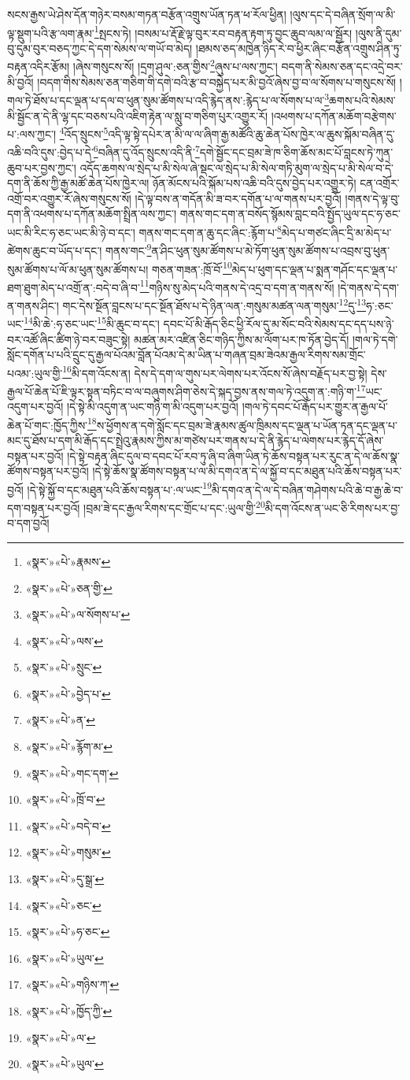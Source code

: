 སངས་རྒྱས་ཡེ་ཤེས་དོན་གཉེར་བསམ་གཏན་བརྩོན་འགྲུས་ཡོན་ཏན་ཕ་རོལ་ཕྱིན། །ལུས་དང་དེ་བཞིན་སྲོག་ལ་མི་ལྟ་སྡུག་པའི་རྩ་ལག་རྣམ་\footnote{«སྣར་»«པེ་»རྣམས་}སྤངས་ཏེ། །བསམ་པ་རྡོ་རྗེ་ལྟ་བུར་རབ་བརྟན་རྟག་ཏུ་བྱང་ཆུབ་ལམ་ལ་སྦྱོར། །ལུས་ནི་དུམ་བུ་དུམ་བུར་བཅད་ཀྱང་དེ་དག་སེམས་ལ་གཡོ་བ་མེད། །ཐམས་ཅད་མཁྱེན་ཉིད་རེ་བ་ཕྱིར་ཞིང་བརྩོན་འགྲུས་ཤིན་ཏུ་བརྟན་འདིར་རྩོམ། །ཞེས་གསུངས་སོ། །དྲག་ཤུལ་:ཅན་གྱིས་\footnote{«སྣར་»«པེ་»ཅན་གྱི་}ཞུས་པ་ལས་ཀྱང་། བདག་ནི་སེམས་ཅན་དང་འདྲེ་བར་མི་བྱའོ། །བདག་གིས་སེམས་ཅན་གཅིག་གི་དགེ་བའི་རྩ་བ་བསྐྱེད་པར་མི་བྱའོ་ཞེས་བྱ་བ་ལ་སོགས་པ་གསུངས་སོ། །གལ་ཏེ་ཐོས་པ་དང་ལྡན་པ་དལ་བ་ཕུན་སུམ་ཚོགས་པ་འདི་རྙེད་ནས་:རྙེད་པ་ལ་སོགས་པ་ལ་\footnote{«སྣར་»«པེ་»ལ་སོགས་པ་}ཆགས་པའི་སེམས་མི་སྦྱོང་ན་དེ་ནི་ལྷ་དང་བཅས་པའི་འཇིག་རྟེན་ལ་སླུ་བ་གཅིག་པུར་འགྱུར་རོ། །འཕགས་པ་དཀོན་མཆོག་བརྩེགས་པ་:ལས་ཀྱང་། \footnote{«སྣར་»«པེ་»ལས་}འོད་སྲུངས་\footnote{«སྣར་»«པེ་»སྲུང་}འདི་ལྟ་སྟེ་དཔེར་ན་མི་ལ་ལ་ཞིག་རྒྱ་མཚོའི་ཆུ་ཆེན་པོས་ཁྱེར་ལ་ཆུས་སྐོམ་བཞིན་དུ་འཆི་བའི་དུས་:བྱེད་པ་དེ་\footnote{«སྣར་»«པེ་»བྱེད་པ་}བཞིན་དུ་འོད་སྲུངས་འདི་ནི་\footnote{«སྣར་»«པེ་»ན་}དགེ་སྦྱོང་དང་བྲམ་ཟེ་ཁ་ཅིག་ཆོས་མང་པོ་བླངས་ཏེ་ཀུན་ཆུབ་པར་བྱས་ཀྱང་། འདོད་ཆགས་ལ་སྲེད་པ་མི་སེལ་ཞེ་སྡང་ལ་སྲེད་པ་མི་སེལ་གཏི་མུག་ལ་སྲེད་པ་མི་སེལ་བ་དེ་དག་ནི་ཆོས་ཀྱི་རྒྱ་མཚོ་ཆེན་པོས་ཁྱེར་ལ། ཉོན་མོངས་པའི་སྐོམ་པས་འཆི་བའི་དུས་བྱེད་པར་འགྱུར་ཏེ། ངན་འགྲོར་འགྲོ་བར་འགྱུར་རོ་ཞེས་གསུངས་སོ། །དེ་ལྟ་བས་ན་གདོན་མི་ཟ་བར་དགོན་པ་ལ་གནས་པར་བྱའོ། །གནས་དེ་ལྟ་བུ་དག་ནི་འཕགས་པ་དཀོན་མཆོག་སྤྲིན་ལས་ཀྱང་། གནས་གང་དག་ན་བསོད་སྙོམས་བླང་བའི་སྤྱོད་ཡུལ་དང་ཧ་ཅང་ཡང་མི་རིང་ཧ་ཅང་ཡང་མི་ཉེ་བ་དང་། གནས་གང་དག་ན་ཆུ་དང་ཞིང་:རྙོག་པ་\footnote{«སྣར་»«པེ་»རྙོག་མ་}མེད་པ་གཙང་ཞིང་དྲི་མ་མེད་པ་ཚེགས་ཆུང་བ་ཡོད་པ་དང་། གནས་གང་\footnote{«སྣར་»«པེ་»གང་དག་}ན་ཤིང་ཕུན་སུམ་ཚོགས་པ་མེ་ཏོག་ཕུན་སུམ་ཚོགས་པ་འབྲས་བུ་ཕུན་སུམ་ཚོགས་པ་ལོ་མ་ཕུན་སུམ་ཚོགས་པ། གཅན་གཟན་:ཁྲོ་བོ་\footnote{«སྣར་»«པེ་»ཁྲོ་བ་}མེད་པ་ཕུག་དང་ལྡན་པ་སྨན་གཤོང་དང་ལྡན་པ་ཐག་ཐུག་མེད་པ་འགྲོ་ན་:བདེ་བ་ཞི་བ་\footnote{«སྣར་»«པེ་»བདེ་བ་}གཉིས་སུ་མེད་པའི་གནས་དེ་འདྲ་བ་དག་ན་གནས་སོ། །དེ་གནས་དེ་དག་ན་གནས་ཤིང་། གང་དེས་སྔོན་བླངས་པ་དང་སྔོན་ཐོས་པ་དེ་ཉིན་ལན་:གསུམ་མཚན་ལན་གསུམ་\footnote{«སྣར་»«པེ་»གསུམ་}དུ་\footnote{«སྣར་»«པེ་»དུ་སྒྲ་}ཧ་:ཅང་ཡང་\footnote{«སྣར་»«པེ་»ཅང་}མི་ཆེ་:ཧ་ཅང་ཡང་\footnote{«སྣར་»«པེ་»ཧ་ཅང་}མི་ཆུང་བ་དང་། དབང་པོ་མི་རྒོད་ཅིང་ཕྱི་རོལ་དུ་མ་སོང་བའི་སེམས་དང་དད་པས་ཉེ་བར་འཚོ་ཞིང་ཚིག་ཉེ་བར་བཟུང་སྟེ། མཚན་མར་འཛིན་ཅིང་གཉིད་ཀྱིས་མ་ལོག་པར་ཁ་ཏོན་བྱེད་དོ། །གལ་ཏེ་དགེ་སློང་དགོན་པ་པའི་དྲུང་དུ་རྒྱལ་པོའམ་བློན་པོའམ་དེ་མ་ཡིན་པ་གཞན་བྲམ་ཟེའམ་རྒྱལ་རིགས་སམ་གྲོང་པའམ་:ཡུལ་གྱི་\footnote{«སྣར་»«པེ་»ཡུལ་}མི་དག་འོངས་ན། དེས་དེ་དག་ལ་གུས་པར་ལེགས་པར་འོངས་སོ་ཞེས་བརྗོད་པར་བྱ་སྟེ། དེས་རྒྱལ་པོ་ཆེན་པོ་ཇི་ལྟར་སྟན་བཏིང་བ་ལ་བཞུགས་ཤིག་ཅེས་དེ་སྐད་བྱས་ནས་གལ་ཏེ་འདུག་ན་:གཉི་ག་\footnote{«སྣར་»«པེ་»གཉིས་ཀ་}ཡང་འདུག་པར་བྱའོ། །དེ་སྟེ་མི་འདུག་ན་ཡང་གཉི་ག་མི་འདུག་པར་བྱའོ། །གལ་ཏེ་དབང་པོ་རྒོད་པར་གྱུར་ན་རྒྱལ་པོ་ཆེན་པོ་གང་:ཁྱོད་ཀྱིས་\footnote{«སྣར་»«པེ་»ཁྱོད་ཀྱི་}ས་ཕྱོགས་ན་དགེ་སློང་དང་བྲམ་ཟེ་རྣམས་ཚུལ་ཁྲིམས་དང་ལྡན་པ་ཡོན་ཏན་དང་ལྡན་པ་མང་དུ་ཐོས་པ་དག་མི་རྒོད་དང་སྤྲེའུ་རྣམས་ཀྱིས་མ་གཙེས་པར་གནས་པ་དེ་ནི་རྙེད་པ་ལེགས་པར་རྙེད་དོ་ཞེས་བསྟན་པར་བྱའོ། །དེ་སྟེ་བརྟན་ཞིང་དུལ་བ་དབང་པོ་རབ་ཏུ་ཞི་བ་ཞིག་ཡིན་ཏེ་ཆོས་བསྟན་པར་རུང་ན་དེ་ལ་ཆོས་སྣ་ཚོགས་བསྟན་པར་བྱའོ། །དེ་སྟེ་ཆོས་སྣ་ཚོགས་བསྟན་པ་ལ་མི་དགའ་ན་དེ་ལ་སྐྱོ་བ་དང་མཐུན་པའི་ཆོས་བསྟན་པར་བྱའོ། །དེ་སྟེ་སྐྱོ་བ་དང་མཐུན་པའི་ཆོས་བསྟན་པ་:ལ་ཡང་\footnote{«སྣར་»«པེ་»ལ་}མི་དགའ་ན་དེ་ལ་དེ་བཞིན་གཤེགས་པའི་ཆེ་བ་རྒྱ་ཆེ་བ་དག་བསྟན་པར་བྱའོ། །བྲམ་ཟེ་དང་རྒྱལ་རིགས་དང་གྲོང་པ་དང་:ཡུལ་གྱི་\footnote{«སྣར་»«པེ་»ཡུལ་}མི་དག་འོངས་ན་ཡང་ཅི་རིགས་པར་བྱ་བ་དག་བྱའོ། 